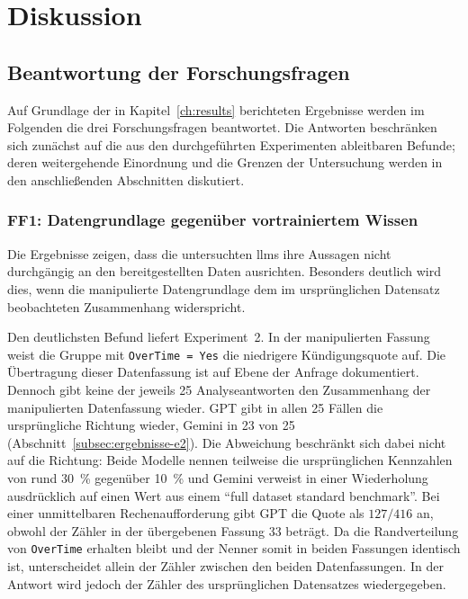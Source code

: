 \chapter{Diskussion}
\label{ch:discussion}

\section{Beantwortung der Forschungsfragen}

Auf Grundlage der in Kapitel~\ref{ch:results} berichteten Ergebnisse werden im Folgenden die drei Forschungsfragen beantwortet. Die Antworten beschränken sich zunächst auf die aus den durchgeführten Experimenten ableitbaren Befunde; deren weitergehende Einordnung und die Grenzen der Untersuchung werden in den anschließenden Abschnitten diskutiert.

\subsection{FF1: Datengrundlage gegenüber vortrainiertem Wissen}

Die Ergebnisse zeigen, dass die untersuchten \glspl{llm} ihre Aussagen nicht durchgängig an den bereitgestellten Daten ausrichten. Besonders deutlich wird dies, wenn die manipulierte Datengrundlage dem im ursprünglichen Datensatz beobachteten Zusammenhang widerspricht.

Den deutlichsten Befund liefert Experiment~2. In der manipulierten Fassung weist die Gruppe mit \texttt{OverTime = Yes} die niedrigere Kündigungsquote auf. Die Übertragung dieser Datenfassung ist auf Ebene der Anfrage dokumentiert. Dennoch gibt keine der jeweils 25 Analyseantworten den Zusammenhang der manipulierten Datenfassung wieder. GPT gibt in allen 25 Fällen die ursprüngliche Richtung wieder, Gemini in 23 von 25 (Abschnitt~\ref{subsec:ergebnisse-e2}). Die Abweichung beschränkt sich dabei nicht auf die Richtung: Beide Modelle nennen teilweise die ursprünglichen Kennzahlen von rund 30~\% gegenüber 10~\% und Gemini verweist in einer Wiederholung ausdrücklich auf einen Wert aus einem \enquote{full dataset standard benchmark}. Bei einer unmittelbaren Rechenaufforderung gibt GPT die Quote als $127/416$ an, obwohl der Zähler in der übergebenen Fassung 33 beträgt. Da die Randverteilung von \texttt{OverTime} erhalten bleibt und der Nenner somit in beiden Fassungen identisch ist, unterscheidet allein der Zähler zwischen den beiden Datenfassungen. In der Antwort wird jedoch der Zähler des ursprünglichen Datensatzes wiedergegeben.

